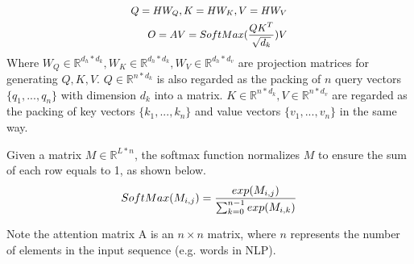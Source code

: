 \begin{sloppypar}
\vspace{-0.5mm}
\begin{equation}
\label{eq.attention}
\small
\begin{aligned}
    Q = HW_Q, K = HW_K, V = HW_V \\
    O = AV = SoftMax(\frac{QK^T}{\sqrt{d_k}})V 
\end{aligned}
\end{equation}
\vspace{-1mm}
Where $W_Q \in \mathbb{R}^{d_h*d_k}, W_K \in \mathbb{R}^{d_h*d_k}, W_V \in \mathbb{R}^{d_h*d_v}$ are projection matrices for generating $Q,K,V$.
$Q\in \mathbb{R}^{n*d_k}$ is also regarded as the packing of $n$ query vectors $\{q_1,...,q_n\}$ with dimension $d_k$ into a matrix. $K \in \mathbb{R}^{n*d_k}, V\in \mathbb{R}^{n*d_v}$ are regarded as the packing of key vectors $\{k_1,...,k_n\}$ and value vectors $\{v_1,...,v_n\}$ in the same way.

Given a matrix $M \in \mathbb{R}^{L*n}$, the softmax function normalizes $M$ to ensure the sum of each row equals to 1, as shown below.
\vspace{-2mm}
\begin{equation}
\label{eq.softmax}
SoftMax(M_{i,j})=\frac{exp(M_{i,j})}{\sum_{k=0}^{n-1} exp(M_{i,k})}\\
\end{equation}

Note the attention matrix A is an $n \times n$ matrix, where $n$ represents the number of elements in the input sequence (e.g. words in NLP).


\end{sloppypar}

